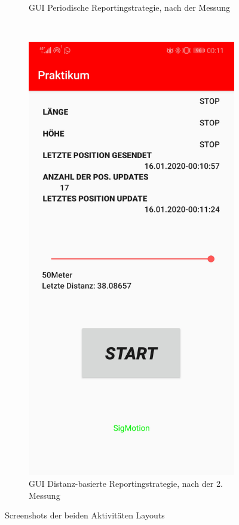\begin{figure}[h!]
\begin{subfigure}[b]{0.35\textwidth}
        \caption{GUI Periodische Reportingstrategie, nach der Messung}
        \label{fig:auswertung1}
    \end{subfigure}
    ~ %
    \begin{subfigure}[b]{0.35\textwidth}
        \includegraphics[width=\textwidth]{Screenshot_route2}
        \caption{GUI Distanz-basierte Reportingstrategie, nach der 2. Messung}
        \label{fig:auswertung2}
    \end{subfigure}
    \caption{Screenshots der beiden Aktivitäten Layouts}
    \label{fig:auswertung}
\end{figure}

